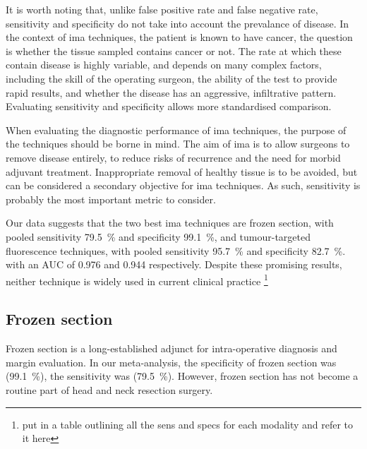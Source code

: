 It is worth noting that, unlike false positive rate and false negative rate, sensitivity and specificity do not take into account the prevalance of disease. 
In the context of \gls{ima} techniques, the patient is known to have cancer, the question is whether the tissue sampled contains cancer or not. 
The rate at which these contain disease is highly variable, and depends on many complex factors, including the skill of the operating surgeon, the ability of the test to provide rapid results, and whether the disease has an aggressive, infiltrative pattern.
Evaluating sensitivity and specificity allows more standardised comparison.

When evaluating the diagnostic performance of \gls{ima} techniques, the purpose of the techniques should be borne in mind. 
The aim of \gls{ima} is to allow surgeons to remove disease entirely, to reduce risks of recurrence and the need for morbid adjuvant treatment.
Inappropriate removal of healthy tissue is to be avoided, but can be considered a secondary objective for \gls{ima} techniques.
As such, sensitivity is probably the most important metric to consider.

Our data suggests that the two best \gls{ima} techniques are frozen section, with pooled sensitivity \SI{79.5}{\percent} and specificity \SI{99.1}{\percent}, and tumour-targeted fluorescence techniques, with pooled sensitivity \SI{95.7}{\percent} and specificity \SI{82.7}{\percent}.
with an AUC of 0.976 and 0.944 respectively.
Despite these promising results, neither technique is widely used in current clinical practice
\footnote{put in a table outlining all the sens and specs for each modality and refer to it here}

\subsection{Frozen section}

Frozen section is a long-established adjunct for intra-operative diagnosis and margin evaluation.
In our meta-analysis, the specificity of frozen section was (\SI{99.1}{\percent}), the sensitivity was (\SI{79.5}{\percent}).
However, frozen section has not become a routine part of head and neck resection surgery.

